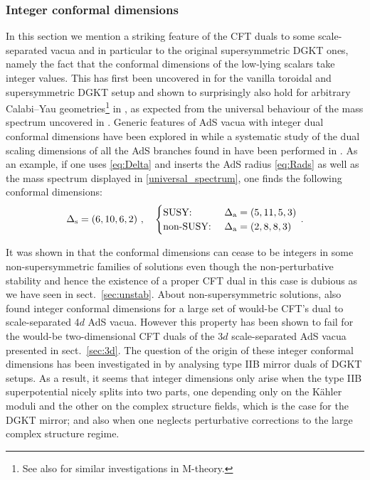 \documentclass[11pt, a4paper]{article}
\begin{document}
\subsubsection{Integer conformal dimensions}
\label{sec:integer}

In this section we mention a striking feature of the CFT duals to some scale-separated vacua and in particular to the original supersymmetric  DGKT ones, namely the fact that the conformal dimensions of the low-lying scalars take integer values. This has first been uncovered in \cite{Conlon:2021cjk} for the vanilla toroidal and supersymmetric DGKT setup and shown to surprisingly also hold for arbitrary Calabi--Yau geometries\footnote{See also \cite{Ning:2022zqx} for similar investigations in M-theory.} in \cite{Apers:2022tfm}, as expected from the universal behaviour of the mass spectrum uncovered in \cite{Marchesano:2019hfb}. Generic features of AdS vacua with integer dual conformal dimensions have been explored in \cite{Apers:2022vfp} while a systematic study of the dual scaling dimensions of all the AdS branches found in \cite{Marchesano:2019hfb} have been performed in \cite{Quirant:2022fpn}. As an example, if one uses \eqref{eq:Delta} and inserts the AdS radius \eqref{eq:Rads} as well as the mass spectrum displayed in \eqref{universal_spectrum}, one finds the following conformal dimensions:
\begin{equation}
\Delta_{\rm s}=\left(6,10,6,2\right)\, ,\quad\begin{cases}
\text{SUSY: }  &\Delta_{\rm a}=(5,11,5,3)\\
\text{non-SUSY: }  &\Delta_{\rm a}=(2,8,8,3)\
\end{cases}\, .
\end{equation}

It was shown in \cite{Quirant:2022fpn} that the conformal dimensions can cease to be integers in some non-supersymmetric families of solutions even though the non-perturbative stability and hence the existence of a proper CFT dual in this case is dubious as we have seen in sect.~\ref{sec:unstab}. About non-supersymmetric solutions, \cite{Apers:2022zjx} also found integer conformal dimensions for a large set of would-be CFT's dual to scale-separated 4$d$ AdS vacua. However this property has been shown to fail for the would-be two-dimensional CFT duals of the 3$d$ scale-separated AdS vacua presented in sect.~\ref{sec:3d}. The question of the origin of these integer conformal dimensions has been investigated in \cite{Plauschinn:2022ztd} by analysing type IIB mirror duals of DGKT setups. As a result, it seems that integer dimensions only arise when the type IIB superpotential nicely splits into two parts, one depending only on the Kähler moduli and the other on the complex structure fields, which is the case for the DGKT mirror; and also when one neglects perturbative corrections to the large complex structure regime.
\end{document}
